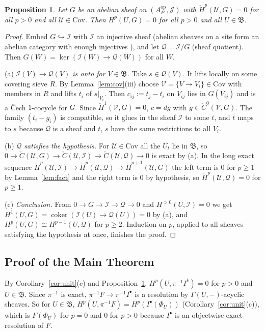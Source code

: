 \documentclass[11pt]{article}
\newtheorem{proposition}[theorem]{Proposition}
\theoremstyle{definition}
\theoremstyle{remark}
\newcommand{\Cov}{\mathrm{Cov}}
\newcommand{\fB}{\mathfrak{B}}
\newcommand{\cJ}{\mathcal{J}}
\newcommand{\cU}{\mathcal{U}}
\newcommand{\cV}{\mathcal{V}}
\newcommand{\cI}{\mathcal{I}}
\newcommand{\cQ}{\mathcal{Q}}
\begin{document}
\begin{proposition}\label{prop:cartan}
Let $G$ be an abelian sheaf on $(A_P^{\mathrm{op}},\cJ)$ with $\check H^p(\cU,G)=0$ for all $p>0$ and all $\cU\in\Cov$. Then $H^p(U,G)=0$ for all $p>0$ and all $U\in\fB$.
\end{proposition}
\begin{proof}
Embed $G\hookrightarrow\cI$ with $\cI$ an injective sheaf (abelian sheaves on a site form an abelian category with enough injectives \cite{Tohoku}), and let $\cQ=\cI/G$ (sheaf quotient). Then $G(W)=\ker(\cI(W)\to\cQ(W))$ for all $W$.

(a) \emph{$\cI(V)\to\cQ(V)$ is onto for $V\in\fB$.} Take $s\in\cQ(V)$. It lifts locally on some covering sieve $R$. By Lemma~\ref{lem:cov}(iii) choose $\cV=\{V\to V_i\}\in\Cov$ with members in $R$ and lifts $t_i$ of $s|_{V_i}$. Then $c_{ij}:=t_j-t_i$ on $V_{ij}$ lies in $G(V_{ij})$ and is a Čech $1$-cocycle for $G$. Since $\check H^1(\cV,G)=0$, $c=dg$ with $g\in\check C^0(\cV,G)$. The family $(t_i-g_i)$ is compatible, so it glues in the sheaf $\cI$ to some $t$, and $t$ maps to $s$ because $\cQ$ is a sheaf and $t$, $s$ have the same restrictions to all $V_i$.

(b) \emph{$\cQ$ satisfies the hypothesis.} For $\cU\in\Cov$ all the $U_t$ lie in $\fB$, so $0\to\check C(\cU,G)\to\check C(\cU,\cI)\to\check C(\cU,\cQ)\to0$ is exact by (a). In the long exact sequence $\check H^p(\cU,\cI)\to\check H^p(\cU,\cQ)\to\check H^{p+1}(\cU,G)$ the left term is $0$ for $p\ge1$ by Lemma~\ref{lem:fact} and the right term is $0$ by hypothesis, so $\check H^p(\cU,\cQ)=0$ for $p\ge1$.

(c) \emph{Conclusion.} From $0\to G\to\cI\to\cQ\to0$ and $H^{>0}(U,\cI)=0$ we get $H^1(U,G)=\operatorname{coker}(\cI(U)\to\cQ(U))=0$ by (a), and $H^p(U,G)\cong H^{p-1}(U,\cQ)$ for $p\ge2$. Induction on $p$, applied to all sheaves satisfying the hypothesis at once, finishes the proof.
\end{proof}

\subsection{Proof of the Main Theorem}
By Corollary~\ref{cor:unit}(c) and Proposition~\ref{prop:cartan}, $H^p(U,\pi^{-1}I^k)=0$ for $p>0$ and $U\in\fB$. Since $\pi^{-1}$ is exact, $\pi^{-1}F\to\pi^{-1}I^\bullet$ is a resolution by $\Gamma(U,-)$-acyclic sheaves. So for $U\in\fB$, $H^p(U,\pi^{-1}F)=H^p(I^\bullet(\Phi_U))$ (Corollary~\ref{cor:unit}(c)), which is $F(\Phi_U)$ for $p=0$ and $0$ for $p>0$ because $I^\bullet$ is an objectwise exact resolution of $F$.
\end{document}
